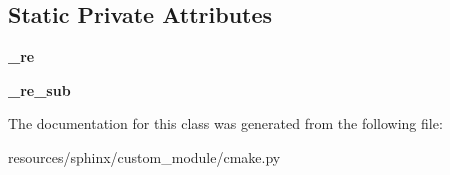 \subsection*{Static Private Attributes}
\begin{DoxyCompactItemize}
\item 
\mbox{\label{classcmake_1_1CMakeXRefRole_aac6d8cdf12356ff1d7d8e71f3fc7b6d8}} 
{\bfseries \+\_\+re}
\item 
\mbox{\label{classcmake_1_1CMakeXRefRole_abee30c04841f76620a3f43cb01fd55a6}} 
{\bfseries \+\_\+re\+\_\+sub}
\end{DoxyCompactItemize}


The documentation for this class was generated from the following file\+:\begin{DoxyCompactItemize}
\item 
resources/sphinx/custom\+\_\+module/cmake.\+py\end{DoxyCompactItemize}
